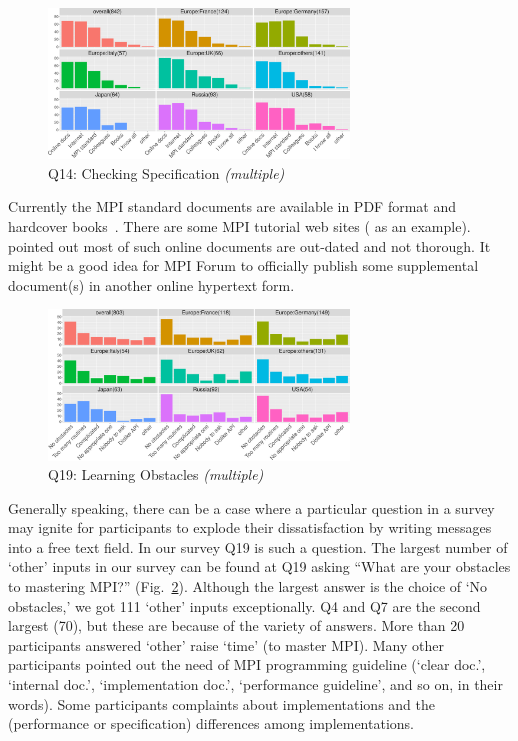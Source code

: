 \documentclass[conference,10pt,letterpaper]{IEEEtran}
\def\myquote#1{`#1'}
\begin{document}
\begin{figure}[htb]
\begin{center}
\includegraphics[width=8cm]{R-scripts/Q14.pdf}
\caption{Q14: Checking Specification {\it(multiple)}}
\label{fig:checking-spec}
\end{center}
\end{figure}

Currently the MPI standard documents are available in PDF format and
hardcover books~\cite{mpi-hardcover}. There are some MPI tutorial web
sites (\cite{mpi-tutorial} as an example). \cite{mpi-tutorial-intro}
pointed out most of such online documents are out-dated and not
thorough. It might be a good idea for MPI Forum to officially publish
some supplemental document(s) in another online hypertext form.

\begin{figure}[htb]
\begin{center}
\includegraphics[width=8cm]{R-scripts/Q19.pdf}
\caption{Q19: Learning Obstacles {\it(multiple)}}
\label{fig:learning-obstacles}
\end{center}
\end{figure}

Generally speaking, there can be a case where a particular question in
a survey may ignite for participants to explode their dissatisfaction
by writing messages into a free text field. In our survey Q19 is
such a question. The 
largest number of \myquote{other} inputs in our survey can be found 
at Q19 asking ``What are your obstacles to mastering MPI?''
(Fig.~\ref{fig:learning-obstacles}). Although the largest answer is
the choice of \myquote{No obstacles,} we got 111 \myquote{other} inputs
exceptionally. Q4 and Q7 are the second largest (70), but these are
because of the variety of answers. 
More than 20 participants answered \myquote{other} raise
\myquote{time} (to master MPI). Many other participants pointed 
out the need of MPI programming guideline (\myquote{clear doc.},
\myquote{internal doc.}, \myquote{implementation 
  doc.}, \myquote{performance guideline}, and so on, in their words).
Some participants complaints about implementations and the
(performance or specification) differences among implementations.  
\end{document}
